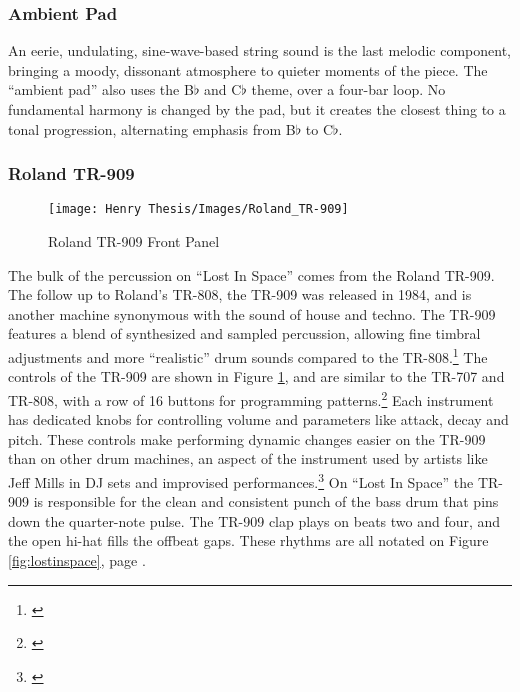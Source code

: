 \documentclass[12pt,twoside]{reedthesis}
\begin{document}
\subsubsection{Ambient Pad}

An eerie, undulating, sine-wave-based string sound is the last melodic component, bringing a moody, dissonant atmosphere to quieter moments of the piece. The ``ambient pad'' also uses the B$\flat$ and C$\flat$ theme, over a four-bar loop. No fundamental harmony is changed by the pad, but it creates the closest thing to a tonal progression, alternating emphasis from B$\flat$ to C$\flat$.

\subsubsection{Roland TR-909}

\begin{figure}
\begin{centering} 
\texttt{[image: Henry Thesis/Images/Roland\_TR-909]}
\caption{Roland TR-909 Front Panel}
\label{fig:TR909}
\end{centering} 
\end{figure}

The bulk of the percussion on ``Lost In Space'' comes from the Roland TR-909. The follow up to Roland's TR-808, the TR-909 was released in 1984, and is another machine synonymous with the sound of house and techno. The TR-909 features a blend of synthesized and sampled percussion, allowing fine timbral adjustments and more ``realistic'' drum sounds compared to the TR-808.\footnote{\cite{annissInstrumentalInstruments9092016}} The controls of the TR-909 are shown in Figure \ref{fig:TR909}, and are similar to the TR-707 and TR-808, with a row of 16 buttons for programming patterns.\footnote{\cite{clusternoteRolandTR9092011}} Each instrument has dedicated knobs for controlling volume and parameters like attack, decay and pitch. These controls make performing dynamic changes easier on the TR-909 than on other drum machines, an aspect of the instrument used by artists like Jeff Mills in DJ sets and improvised performances.\footnote{\cite{millsJeffMillsExhibitionist}} On ``Lost In Space'' the TR-909 is responsible for the clean and consistent punch of the bass drum that pins down the quarter-note pulse. The TR-909 clap plays on beats two and four, and the open hi-hat fills the offbeat gaps. These rhythms are all notated on Figure \ref{fig:lostinspace}, page \pageref{fig:lostinspace}.
\end{document}
